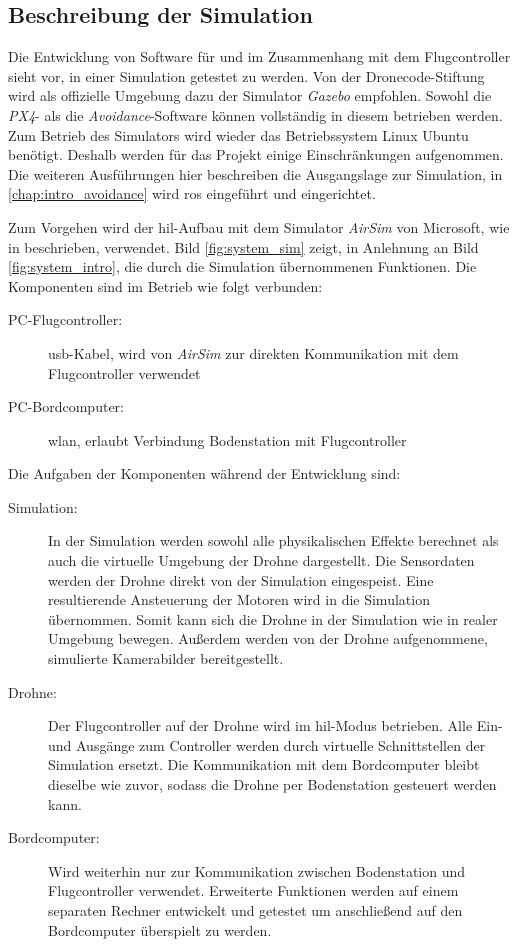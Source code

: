 \subsection{Beschreibung der Simulation}\label{chap:intro_simulation}
Die Entwicklung von Software für und im Zusammenhang mit dem Flugcontroller sieht vor, in einer Simulation getestet zu werden. Von der Dronecode-Stiftung wird als offizielle Umgebung dazu der Simulator \textit{Gazebo} empfohlen\cite{dronecodestiftungSimulationPX4User}. Sowohl die \textit{PX4}- als die \textit{Avoidance}-Software können vollständig in diesem betrieben werden. Zum Betrieb des Simulators wird wieder das Betriebssystem Linux Ubuntu benötigt. Deshalb werden für das Projekt einige Einschränkungen aufgenommen. Die weiteren Ausführungen hier beschreiben die Ausgangslage zur Simulation, in \cref{chap:intro_avoidance} wird \acrshort{ros} eingeführt und eingerichtet.

Zum Vorgehen wird der \gls{hil}-Aufbau mit dem Simulator \textit{AirSim} von Microsoft\cite{microsoftcorporationWelcomeAirSim2023}, wie in \cite[Kapitel 3.4.1]{markusreinErweiterungBestehenderDrohnen2023} beschrieben, verwendet. Bild \ref{fig:system_sim} zeigt, in Anlehnung an Bild \ref{fig:system_intro}, die durch die Simulation übernommenen Funktionen. Die Komponenten sind im Betrieb wie folgt verbunden:
\begin{description}
    \item[PC-Flugcontroller:] \acrshort{usb}-Kabel, wird von \textit{AirSim} zur direkten Kommunikation mit dem Flugcontroller verwendet
    \item[PC-Bordcomputer:] \acrshort{wlan}, erlaubt Verbindung Bodenstation mit Flugcontroller
\end{description}

Die Aufgaben der Komponenten während der Entwicklung sind:
\begin{description}
    \item[Simulation:] In der Simulation werden sowohl alle physikalischen Effekte berechnet als auch die virtuelle Umgebung der Drohne dargestellt. Die Sensordaten werden der Drohne direkt von der Simulation eingespeist. Eine resultierende Ansteuerung der Motoren wird in die Simulation übernommen. Somit kann sich die Drohne in der Simulation wie in realer Umgebung bewegen. Außerdem werden von der Drohne aufgenommene, simulierte Kamerabilder bereitgestellt.
    \item[Drohne:] Der Flugcontroller auf der Drohne wird im \gls{hil}-Modus betrieben. Alle Ein- und Ausgänge zum Controller werden durch virtuelle Schnittstellen der Simulation ersetzt. Die Kommunikation mit dem Bordcomputer bleibt dieselbe wie zuvor, sodass die Drohne per Bodenstation gesteuert werden kann.
    \item[Bordcomputer:] Wird weiterhin nur zur Kommunikation zwischen Bodenstation und Flugcontroller verwendet. Erweiterte Funktionen werden auf einem separaten Rechner entwickelt und getestet um anschließend auf den Bordcomputer überspielt zu werden.
\end{description}

